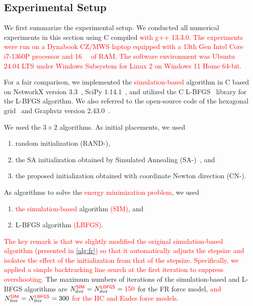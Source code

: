 \documentclass[11pt]{article}
\newcommand{\red}[1]{\textcolor{red}{#1}}
\newcommand{\Cpp}{C
\nolinebreak[4]
\hspace{-.05em}\raisebox{.4ex}{\relsize{-3}{\textbf{++}}}}
\begin{document}
\subsection{Experimental Setup}
\label{ssec:setup}

We first summarize the experimental setup.
We conducted all numerical experiments in this section using \Cpp{17} compiled \red{with g++ 13.3.0}.
\red{The experiments were run on a Dynabook CZ/MWS laptop equipped with a 13th Gen Intel Core i7-1360P processor and \SI{16}{\giga\byte} of RAM.
  The software environment was Ubuntu 24.04 LTS under Windows Subsystem for Linux 2 on Windows 11 Home 64-bit.}

For a fair comparison, we implemented the \red{simulation-based} algorithm in \Cpp{} based on NetworkX version 3.3~\citep{hagbergExploringNetworkStructure2008}, SciPy 1.14.1~\citep{2020SciPy-NMeth}, and utilized the \Cpp{} L-BFGS~\citep{qiuYixuanLBFGSpp2024,okazakiChokkanLiblbfgs2024} library for the L-BFGS algorithm.
We also referred to the open-source code of the hexagonal grid~\citep{patelHexagonalGrids2013} and Graphviz version 2.43.0~\citep{ellsonGraphvizOpenSource2002}.

We used the $3 \times 2$ algorithms.
As initial placements, we used
\begin{enumerate}[label=\textbullet, itemsep=0pt, parsep=0pt]
  \item random initialization (\textsf{RAND-}),

  \item the SA initialization obtained by Simulated Annealing (\textsf{SA-})~\citep{ghassemitoosiSimulatedAnnealingPreProcessing2016}, and

  \item the proposed initialization obtained with coordinate Newton direction (\textsf{CN-}).
\end{enumerate}
As algorithms to solve the \red{energy minimization problem}, we used
\begin{enumerate}[label=\textbullet, itemsep=0pt, parsep=0pt]
  \item \red{the simulation-based} algorithm \red{(\textsf{SIM})}, and

  \item L-BFGS algorithm \red{(\textsf{LBFGS})}.
\end{enumerate}
\red{The key remark is that we slightly modified the original simulation-based algorithm (presented in \cref{alg:fr}) so that it automatically adjusts the stepsize and isolates the effect of the initialization from that of the stepsize.
  Specifically, we applied a simple backtracking line search at the first iteration to suppress overshooting.}
The maximum numbers of iterations of the simulation-based and L-BFGS algorithms are $N_{\mathrm{iter}}^{\mathsf{\red{SIM}}}= N_{\mathrm{iter}}^{\mathsf{\red{LBFGS}}}= \red{150}$ for the FR force model, \red{and $N_{\mathrm{iter}}^{\mathsf{\red{SIM}}}= N_{\mathrm{iter}}^{\mathsf{\red{LBFGS}}}= 300$ for the HC and Eades force models.}
\end{document}
